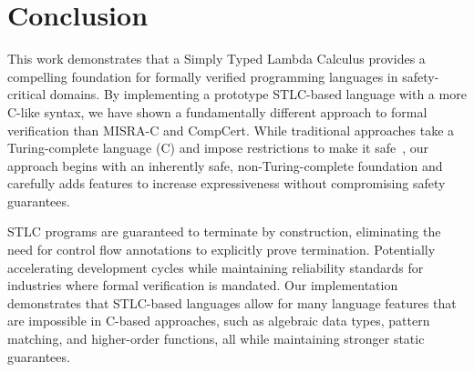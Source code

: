 \documentclass[conference]{IEEEtran}
\begin{document}
\section{Conclusion}
This work demonstrates that a Simply Typed Lambda Calculus provides a compelling foundation for formally verified programming languages in safety-critical domains. By implementing a prototype STLC-based language with a more C-like syntax, we have shown a fundamentally different approach to formal verification than MISRA-C and CompCert. While traditional approaches take a Turing-complete language (C) and impose restrictions to make it safe~\cite{seacord2005}, our approach begins with an inherently safe, non-Turing-complete foundation and carefully adds features to increase expressiveness without compromising safety guarantees.

STLC programs are guaranteed to terminate by construction, eliminating the need for control flow annotations to explicitly prove termination. Potentially accelerating development cycles while maintaining reliability standards for industries where formal verification is mandated. Our implementation demonstrates that STLC-based languages allow for many language features that are impossible in C-based approaches, such as algebraic data types, pattern matching, and higher-order functions, all while maintaining stronger static guarantees.
\end{document}
